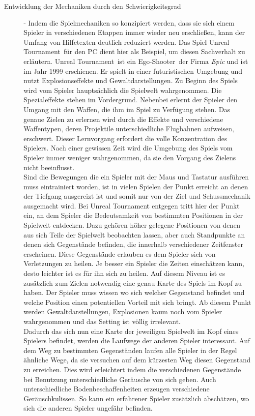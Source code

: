 \begin{description}
\item[Entwicklung der Mechaniken durch den Schwierigkeitsgrad] - Indem die Spielmechaniken so konzipiert werden, dass sie sich einem Spieler in verschiedenen Etappen immer wieder neu erschließen, kann der Umfang von Hilfetexten deutlich reduziert werden. Das Spiel \glqq Unreal Tournament\grqq\ für den PC dient hier als Beispiel, um diesen Sachverhalt zu erläutern. \glqq Unreal Tournament\grqq\ ist ein \glqq Ego-Shooter\grqq\ der Firma \textit{Epic} und ist im Jahr 1999 erschienen. Er spielt in einer futuristischen Umgebung und nutzt Explosionseffekte und Gewaltdarstellungen. Zu Beginn des Spiels wird vom Spieler hauptsächlich die Spielwelt wahrgenommen. Die Spezialeffekte stehen im Vordergrund. Nebenbei erlernt der Spieler den Umgang mit den Waffen, die ihm im Spiel zu Verfügung stehen. Das genaue Zielen zu erlernen wird durch die Effekte und verschiedene Waffentypen, deren Projektile unterschiedliche Flugbahnen aufweisen, erschwert. Dieser Lernvorgang erfordert die volle Konzentration des Spielers. Nach einer gewissen Zeit wird die Umgebung des Spiels vom Spieler immer weniger wahrgenommen, da sie den Vorgang des Zielens nicht beeinflusst. \\
Sind die Bewegungen die ein Spieler mit der Maus und Tastatur ausführen muss eintrainiert worden, ist in vielen Spielen der Punkt erreicht an denen der Tiefgang ausgereizt ist und somit nur von der Ziel und Schussmechanik ausgemacht wird. Bei Unreal Tournament entgegen tritt hier der Punkt ein, an dem Spieler die Bedeutsamkeit von bestimmten Positionen in der Spielwelt entdecken. Dazu gehören höher gelegene Positionen von denen aus sich Teile der Spielwelt beobachten lassen, aber auch Standpunkte an denen sich Gegenstände befinden, die innerhalb verschiedener Zeitfenster erscheinen. Diese Gegenstände erlauben es dem Spieler sich von Verletzungen zu heilen. Je besser ein Spieler die Zeiten einschätzen kann, desto leichter ist es für ihn sich zu heilen. Auf diesem Niveau ist es zusätzlich zum Zielen notwendig eine genau Karte des Spiels im Kopf zu haben. Der Spieler muss wissen wo sich welcher Gegenstand befindet und welche Position einen potentiellen Vorteil mit sich bringt. Ab diesem Punkt werden Gewaltdarstellungen, Explosionen kaum noch vom Spieler wahrgenommen und das Setting ist völlig irrelevant.\\
Dadurch das sich nun eine Karte der jeweiligen Spielwelt im Kopf eines Spielers befindet, werden die Laufwege der anderen Spieler interessant. Auf dem Weg zu bestimmten Gegenständen laufen alle Spieler in der Regel ähnliche Wege, da sie versuchen auf dem kürzesten Weg diesen Gegenstand zu erreichen. Dies wird erleichtert indem die verschiedenen Gegenstände bei Benutzung unterschiedliche Geräusche von sich geben. Auch unterschiedliche Bodenbeschaffenheiten erzeugen verschiedene Geräuschkulissen. So kann ein erfahrener Spieler zusätzlich abschätzen, wo sich die anderen Spieler ungefähr befinden. \\

\end{description}
